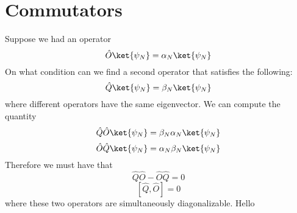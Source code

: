 \section{Commutators}

Suppose we had an operator 
\[
    \hat{O}  \ket{\psi _N} = \alpha_N \ket{\psi_N}
\]
On what condition can we find a second operator that satisfies the following:
\[
    \hat{Q}  \ket{\psi _N}= \beta_N \ket{\psi_N}
\] where different operators have the same eigenvector. We can compute the quantity 
\[
    \hat{Q}  \hat{O}  \ket{\psi_N} = \beta_N \alpha_N \ket{\psi _N}
\]
\[
    \hat{O}  \hat{Q}  \ket{\psi _N} = \alpha_N \beta_N \ket{\psi _N}
\]
Therefore we must have that 
\[
    \hat{Q} \hat{O} -\hat{O} \hat{Q} = 0
\]
\[
    \left[ \hat{Q} ,\hat{O}  \right] = 0
\] where these two operators are simultaneously diagonalizable. 
Hello